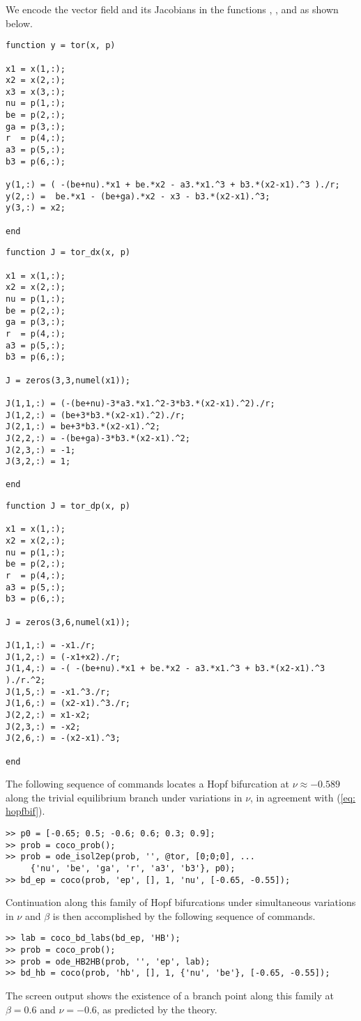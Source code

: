 We encode the vector field and its Jacobians in the functions , , and  as shown below.
\begin{lstlisting}[language=coco-highlight]
function y = tor(x, p)

x1 = x(1,:);
x2 = x(2,:);
x3 = x(3,:);
nu = p(1,:);
be = p(2,:);
ga = p(3,:);
r  = p(4,:);
a3 = p(5,:);
b3 = p(6,:);

y(1,:) = ( -(be+nu).*x1 + be.*x2 - a3.*x1.^3 + b3.*(x2-x1).^3 )./r;
y(2,:) =  be.*x1 - (be+ga).*x2 - x3 - b3.*(x2-x1).^3;
y(3,:) = x2;

end
\end{lstlisting}
\begin{lstlisting}[language=coco-highlight]
function J = tor_dx(x, p)

x1 = x(1,:);
x2 = x(2,:);
nu = p(1,:);
be = p(2,:);
ga = p(3,:);
r  = p(4,:);
a3 = p(5,:);
b3 = p(6,:);

J = zeros(3,3,numel(x1));

J(1,1,:) = (-(be+nu)-3*a3.*x1.^2-3*b3.*(x2-x1).^2)./r;
J(1,2,:) = (be+3*b3.*(x2-x1).^2)./r;
J(2,1,:) = be+3*b3.*(x2-x1).^2;
J(2,2,:) = -(be+ga)-3*b3.*(x2-x1).^2;
J(2,3,:) = -1;
J(3,2,:) = 1;

end
\end{lstlisting}
\begin{lstlisting}[language=coco-highlight]
function J = tor_dp(x, p)

x1 = x(1,:);
x2 = x(2,:);
nu = p(1,:);
be = p(2,:);
r  = p(4,:);
a3 = p(5,:);
b3 = p(6,:);

J = zeros(3,6,numel(x1));

J(1,1,:) = -x1./r;
J(1,2,:) = (-x1+x2)./r;
J(1,4,:) = -( -(be+nu).*x1 + be.*x2 - a3.*x1.^3 + b3.*(x2-x1).^3 )./r.^2;
J(1,5,:) = -x1.^3./r;
J(1,6,:) = (x2-x1).^3./r;
J(2,2,:) = x1-x2;
J(2,3,:) = -x2;
J(2,6,:) = -(x2-x1).^3;

end
\end{lstlisting}
The following sequence of commands locates a Hopf bifurcation at $\nu\approx -0.589$ along the trivial equilibrium branch under variations in $\nu$, in agreement with (\ref{eq: hopfbif}).
\begin{lstlisting}[language=coco-highlight]
>> p0 = [-0.65; 0.5; -0.6; 0.6; 0.3; 0.9];
>> prob = coco_prob();
>> prob = ode_isol2ep(prob, '', @tor, [0;0;0], ...
     {'nu', 'be', 'ga', 'r', 'a3', 'b3'}, p0);
>> bd_ep = coco(prob, 'ep', [], 1, 'nu', [-0.65, -0.55]);
\end{lstlisting}
Continuation along this family of Hopf bifurcations under simultaneous variations in $\nu$ and $\beta$ is then accomplished by the following sequence of commands.
\begin{lstlisting}[language=coco-highlight]
>> lab = coco_bd_labs(bd_ep, 'HB');
>> prob = coco_prob();
>> prob = ode_HB2HB(prob, '', 'ep', lab);
>> bd_hb = coco(prob, 'hb', [], 1, {'nu', 'be'}, [-0.65, -0.55]);
\end{lstlisting}
The screen output shows the existence of a branch point along this family at $\beta=0.6$ and $\nu=-0.6$, as predicted by the theory. 

